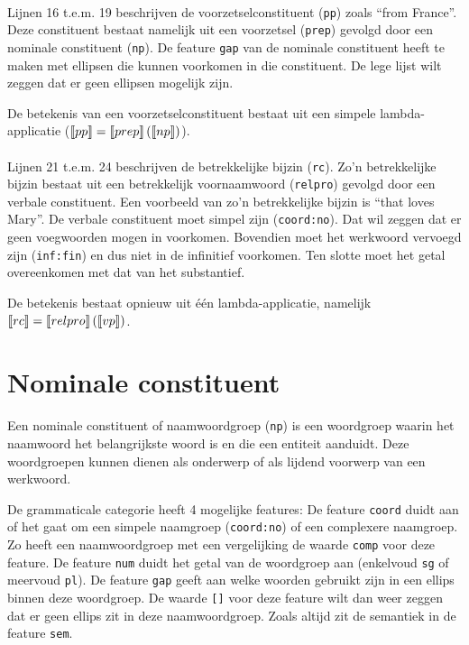 \paragraph{} Lijnen 16 t.e.m. 19 beschrijven de voorzetselconstituent (\texttt{pp}) zoals ``from France''. Deze constituent bestaat namelijk uit een voorzetsel (\texttt{prep}) gevolgd door een nominale constituent (\texttt{np}). De feature \texttt{gap} van de nominale constituent heeft te maken met ellipsen die kunnen voorkomen in die constituent. De lege lijst wilt zeggen dat er geen ellipsen mogelijk zijn.

De betekenis van een voorzetselconstituent bestaat uit een simpele lambda-applicatie ($\llbracket pp\rrbracket = \llbracket prep\rrbracket \left( \llbracket np\rrbracket \right)$).

\paragraph{} Lijnen 21 t.e.m. 24 beschrijven de betrekkelijke bijzin (\texttt{rc}). Zo'n betrekkelijke bijzin bestaat uit een betrekkelijk voornaamwoord (\texttt{relpro}) gevolgd door een verbale constituent. Een voorbeeld van zo'n betrekkelijke bijzin is ``that loves Mary''. De verbale constituent moet simpel zijn (\texttt{coord:no}). Dat wil zeggen dat er geen voegwoorden mogen in voorkomen. Bovendien moet het werkwoord vervoegd zijn (\texttt{inf:fin}) en dus niet in de infinitief voorkomen. Ten slotte moet het getal overeenkomen met dat van het substantief.

De betekenis bestaat opnieuw uit één lambda-applicatie, namelijk $\llbracket rc\rrbracket = \llbracket relpro\rrbracket \left( \llbracket vp\rrbracket \right)$.

\section{Nominale constituent}
Een nominale constituent of naamwoordgroep (\texttt{np}) is een woordgroep waarin het naamwoord het belangrijkste woord is en die een entiteit aanduidt. Deze woordgroepen kunnen dienen als onderwerp of als lijdend voorwerp van een werkwoord.

De grammaticale categorie heeft 4 mogelijke features: De feature \texttt{coord} duidt aan of het gaat om een simpele naamgroep (\texttt{coord:no}) of een complexere naamgroep. Zo heeft een naamwoordgroep met een vergelijking de waarde \texttt{comp} voor deze feature. De feature \texttt{num} duidt het getal van de woordgroep aan (enkelvoud \texttt{sg} of meervoud \texttt{pl}). De feature \texttt{gap} geeft aan welke woorden gebruikt zijn in een ellips binnen deze woordgroep. De waarde \texttt{[]} voor deze feature wilt dan weer zeggen dat er geen ellips zit in deze naamwoordgroep. Zoals altijd zit de semantiek in de feature \texttt{sem}.

